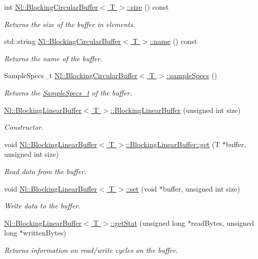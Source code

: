 \begin{DoxyCompactItemize}
int \hyperlink{group__Audio_ga8e5076598374af82eb754cea0c88d12d}{Nl\+::\+Blocking\+Circular\+Buffer$<$ T $>$\+::size} () const 
\begin{DoxyCompactList}\small\item\em Returns the size of the buffer in elements. \end{DoxyCompactList}\item 
std\+::string \hyperlink{group__Audio_gad287c03d36b07643b960d531b5553109}{Nl\+::\+Blocking\+Circular\+Buffer$<$ T $>$\+::name} () const 
\begin{DoxyCompactList}\small\item\em Returns the name of the buffer. \end{DoxyCompactList}\item 
Sample\+Specs\+\_\+t \hyperlink{group__Audio_gaa20cb3b07f5820cd2a3d70f724460659}{Nl\+::\+Blocking\+Circular\+Buffer$<$ T $>$\+::sample\+Specs} ()
\begin{DoxyCompactList}\small\item\em Returns the \hyperlink{structNl_1_1SampleSpecs__t}{Sample\+Specs\+\_\+t} of the buffer. \end{DoxyCompactList}\item 
\hyperlink{group__Audio_gae6f35f45439b194a69587bd9c124a736}{Nl\+::\+Blocking\+Linear\+Buffer$<$ T $>$\+::\+Blocking\+Linear\+Buffer} (unsigned int size)
\begin{DoxyCompactList}\small\item\em Constructor. \end{DoxyCompactList}\item 
void \hyperlink{group__Audio_ga7fd45f57444309f03fab9a13644d2240}{Nl\+::\+Blocking\+Linear\+Buffer$<$ T $>$\+::\+Blocking\+Linear\+Buffer\+::get} (T $\ast$buffer, unsigned int size)
\begin{DoxyCompactList}\small\item\em Read data from the buffer. \end{DoxyCompactList}\item 
void \hyperlink{group__Audio_gacd7c49cb333fc991edae3247d2fb34ef}{Nl\+::\+Blocking\+Linear\+Buffer$<$ T $>$\+::set} (void $\ast$buffer, unsigned int size)
\begin{DoxyCompactList}\small\item\em Write data to the buffer. \end{DoxyCompactList}\item 
\hyperlink{group__Audio_gabdd2b325cd5a2383579737299b4b3aca}{Nl\+::\+Blocking\+Linear\+Buffer$<$ T $>$\+::get\+Stat} (unsigned long $\ast$read\+Bytes, unsigned long $\ast$written\+Bytes)
\begin{DoxyCompactList}\small\item\em Returns information on read/write cycles on the buffer. \end{DoxyCompactList}\end{DoxyCompactItemize}


